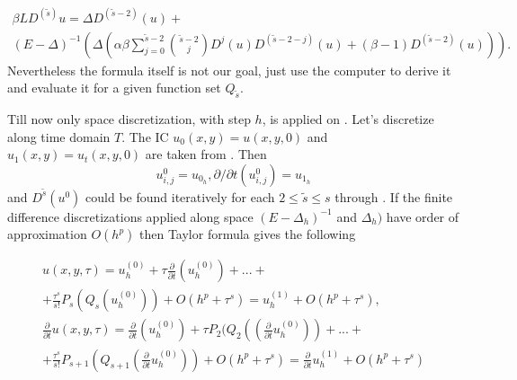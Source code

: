\documentclass[11pt,a4paper,twoside]{article}
\begin{document}
\begin{align*}
\beta LD^{(\tilde s)} u =   \Delta D^{ (\tilde s - 2) }(u)  +
\\
 (E - \Delta)^{-1}( \Delta ( \alpha \beta \sum_{j=0}^{ \tilde s - 2}  { \tilde s - 2\choose j} D^j(u) D^{ (\tilde s - 2 - j) }(u)+ (\beta -1) D^{ (\tilde s - 2) }(u) ) ).
\end{align*}
Nevertheless the formula itself is not our goal, just use the computer to derive it and evaluate it for a given function set $Q_{\tilde s}$.


Till now only space discretization, with step $h$, is applied on . Let's discretize along time domain $T$. The IC $u_0(x,y) = u(x,y,0)$ and $u_1(x,y) = u_t(x,y,0)$ are taken from \cite{EllipticProblem}. Then
$$
u_{i,j}^0 = u_{0_h}, \partial / \partial t (u_{i,j}^0) = u_{1_h}
$$
and $D^{\tilde s}(u^0)$ could be found iteratively for each $2 \leq \tilde s \leq s$ through . If the finite difference discretizations applied along space $(E - \Delta_h)^{-1}$ and $\Delta_h )$ have order of approximation $O(h^p)$ then Taylor formula gives the following

\begin{align*}
u(x,y,\tau) = u_h^{(0)} + \tau \frac{\partial}{\partial t}(u_h^{(0)}) + ... +
\\ + \frac{\tau^s}{ s! } P_s( Q_s(u_h^{(0)}) ) + O(h^p + \tau^s) = u_h^{(1)} + O(h^p + \tau^s),
\\  \frac{\partial}{\partial t}u(x,y,\tau) = \frac{\partial}{\partial t}( u_h^{(0)}) + \tau P_2( Q_2( (\frac{\partial}{\partial t} u_h^{(0)}) ) + ... +
\\ + \frac{\tau^s}{ s! } P_{s+1}( Q_{s+1}(\frac{\partial}{\partial t}u_h^{(0)}) ) + O(h^p + \tau^s) = \frac{\partial}{\partial t}u_h^{(1)} + O(h^p + \tau^s)
\end{align*}
\end{document}
